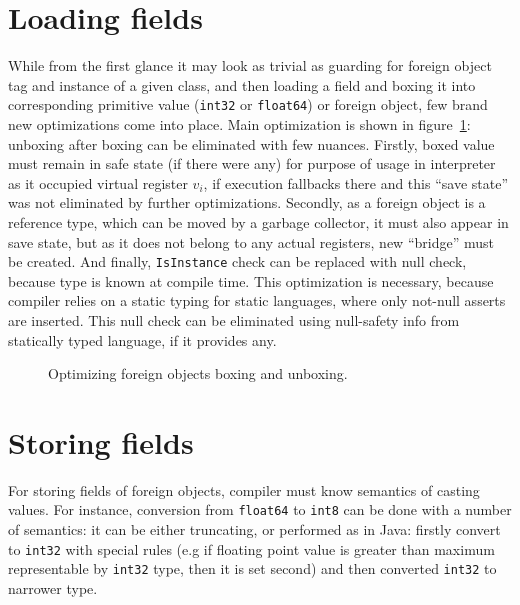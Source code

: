 \documentclass[times, %
			   specification,annotation, %
			   titlepage-extra-ru,specification-extra-ru,annotation-extra-ru, %
			   languages={russian,english} %
			  ]{itmo-student-thesis}
\begin{document}
\section{Loading fields}
While from the first glance it may look as trivial as guarding for foreign object tag and instance of a given class, and then loading a field and boxing it into corresponding primitive value (\texttt{int32} or \texttt{float64}) or foreign object, few brand new optimizations come into place. Main optimization is shown in figure~\ref{fig:field-opt}: unboxing after boxing can be eliminated with few nuances. Firstly, boxed value must remain in safe state (if there were any) for purpose of usage in interpreter as it occupied virtual register $v_i$, if execution fallbacks there and this ``save state'' was not eliminated by further optimizations. Secondly, as a foreign object is a reference type, which can be moved by a garbage collector, it must also appear in save state, but as it does not belong to any actual registers, new ``bridge'' must be created. And finally, \texttt{IsInstance} check can be replaced with null check, because type is known at compile time. This optimization is necessary, because compiler relies on a static typing for static languages, where only not-null asserts are inserted. This null check can be eliminated using null-safety info from statically typed language, if it provides any.
\begin{figure}[H]
	\caption{Optimizing foreign objects boxing and unboxing.}\label{fig:field-opt}
	\centering
	\end{figure}

\section{Storing fields}
For storing fields of foreign objects, compiler must know semantics of casting values. For instance, conversion from \texttt{float64} to \texttt{int8} can be done with a number of semantics: it can be either truncating, or performed as in Java: firstly convert to \texttt{int32} with special rules (e.g if floating point value is greater than maximum representable by \texttt{int32} type, then it is set second) and then converted \texttt{int32} to narrower type.
\end{document}
